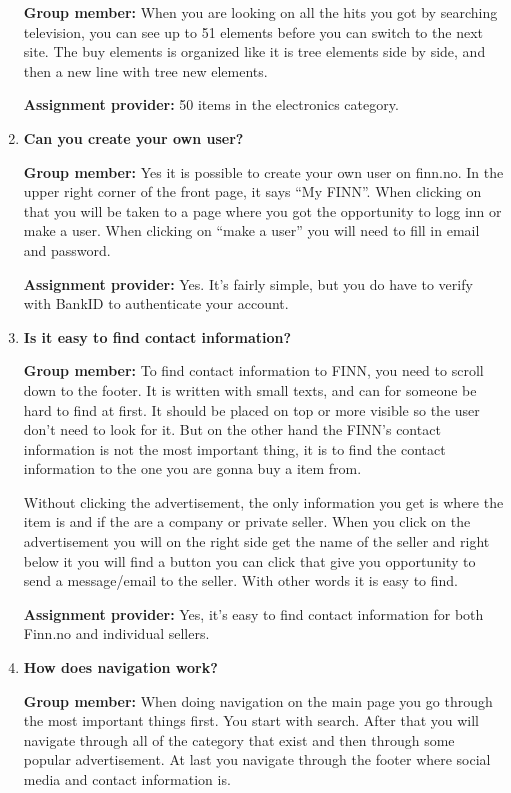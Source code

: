 \begin{enumerate}
\textbf{Group member:} 
When you are looking on all the hits you got by searching television, you can see up to 51 elements before you can switch to the next site. The buy elements is organized like it is tree elements side by side, and then a new line with tree new elements. 

\textbf{Assignment provider:}
50 items in the electronics category.

    \item \textbf{Can you create your own user?}

\textbf{Group member:} 
Yes it is possible to create your own user on finn.no. In the upper right corner of the front page, it says “My FINN”. When clicking on that you will be taken to a page where you got the opportunity to logg inn or make a user. When clicking on “make a user” you will need to fill in email and password. 

\textbf{Assignment provider:}
Yes. It’s fairly simple, but you do have to verify with BankID to authenticate your account.

    \item \textbf{Is it easy to find contact information?}

\textbf{Group member:} 
To find contact information to FINN, you need to scroll down to the footer. It is written with small texts, and can for someone be hard to find at first. It should be placed on top or more visible so the user don't need to look for it. But on the other hand the FINN’s contact information is not the most important thing, it is to find the contact information to the one you are gonna buy a item from.

Without clicking the advertisement, the only information you get is where the item is and if the are a company or private seller. When you click on the advertisement you will on the right side get the name of the seller and right below it you will find a button you can click that give you opportunity to send a message/email to the seller. With other words it is easy to find.

\textbf{Assignment provider:}
Yes, it’s easy to find contact information for both Finn.no and individual sellers.
	
    \item \textbf{How does navigation work?}

\textbf{Group member:} 
When doing navigation on the main page you go through the most important things first. You start with search. After that you will navigate through all of the category that exist and then through some popular advertisement. At last you navigate through the footer where social media and contact information is. 


\end{enumerate}
